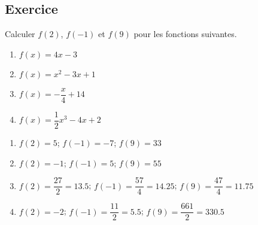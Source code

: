 \documentclass[a4paper,11pt]{article}
\begin{document}
\subsection{Exercice}
Calculer $f(2)$, $f(-1)$ et $f(9)$ pour les fonctions suivantes.
\begin{multicols}{2}
\begin{enumerate}
\item $f(x)=4x-3$
\item $f(x)=x^2-3x+1$
\item $f(x)=-\dfrac{x}{4}+14$
\item $f(x)=\dfrac{1}{2}x^3-4x+2$
\end{enumerate}
\end{multicols}

\begin{solution}
\begin{enumerate}
\item $f(2)=5$; $f(-1)=-7$; $f(9)=33$
\item $f(2)=-1$; $f(-1)=5$; $f(9)=55$
\item $f(2)=\dfrac{27}{2}=13.5$; $f(-1)=\dfrac{57}{4}=14.25$; $f(9)=\dfrac{47}{4}=11.75$
\item $f(2)=-2$; $f(-1)=\dfrac{11}{2}=5.5$; $f(9)=\dfrac{661}{2}=330.5$
\end{enumerate}
\end{solution}
\end{document}
